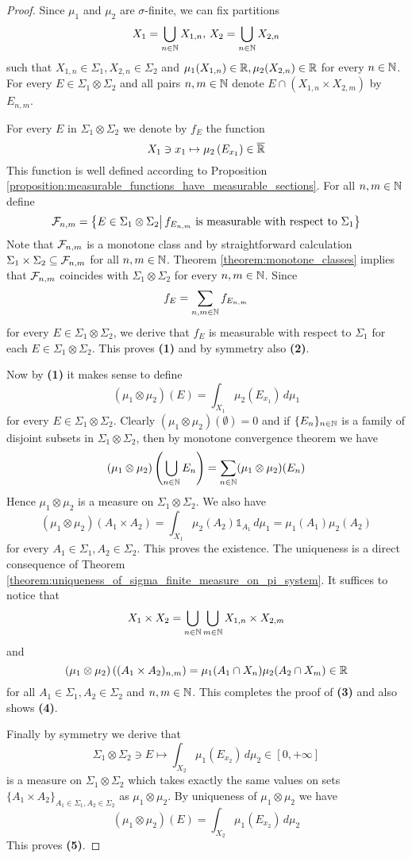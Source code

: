 \begin{proof}
    Since $\mu_1$ and $\mu_2$ are $\sigma$-finite, we can fix partitions
    $$X_1 = \bigcup_{n\in {\mathbb N}}X_{1,n},\,X_2 = \bigcup_{n\in {\mathbb N}}X_{2,n}$$
    such that $X_{1,n}\in \Sigma_1,X_{2,n}\in \Sigma_2$ and $\mu_1(X_{1,n})\in {\mathbb R},\mu_2(X_{2,n})\in {\mathbb R}$ for every $n\in {\mathbb N}$. For every $E \in \Sigma_1\otimes \Sigma_2$ and all pairs $n,m\in {\mathbb N}$ denote $E\cap (X_{1,n}\times X_{2,m})$ by $E_{n,m}$.

    For every $E$ in $\Sigma_1\otimes \Sigma_2$ we denote by $f_E$ the function
    $$X_1\ni x_1 \mapsto \mu_2\left(E_{x_1}\right)\in \overline{{\mathbb R}}$$
    This function is well defined according to Proposition \ref{proposition:measurable_functions_have_measurable_sections}. For all $n,m\in {\mathbb N}$ define 
    $${\mathcal F}_{n,m} = \big\{E \in \Sigma_1\otimes \Sigma_2 \big|\,f_{E_{n,m}}\mbox{ is measurable with respect to }\Sigma_1\big\}$$
    Note that ${\mathcal F}_{n,m}$ is a monotone class and by straightforward calculation $\Sigma_1\times \Sigma_2\subseteq {\mathcal F}_{n,m}$ for all $n,m\in {\mathbb N}$. Theorem \ref{theorem:monotone_classes} implies that ${\mathcal F}_{n,m}$ coincides with $\Sigma_1\otimes \Sigma_2$ for every $n,m \in {\mathbb N}$. Since
    $$f_{E} = \sum_{n,m\in {\mathbb N}}f_{E_{n,m}}$$
    for every $E \in \Sigma_1\otimes \Sigma_2$, we derive that $f_E$ is measurable with respect to $\Sigma_1$ for each $E \in \Sigma_1\otimes \Sigma_2$. This proves \textbf{(1)} and by symmetry also \textbf{(2)}.
    
    Now by \textbf{(1)} it makes sense to define
    $$(\mu_1\otimes \mu_2)(E) = \int_{X_1}\mu_2(E_{x_1})\,d\mu_1$$
    for every $E\in \Sigma_1\otimes \Sigma_2$. Clearly $(\mu_1\otimes \mu_2)(\emptyset) = 0$ and if $\{E_n\}_{n\in {\mathbb N}}$ is a family of disjoint subsets in $\Sigma_1\otimes \Sigma_2$, then by monotone convergence theorem we have
    $$(\mu_1\otimes \mu_2)\left(\bigcup_{n\in {\mathbb N}}E_n\right) = \sum_{n\in {\mathbb N}}(\mu_1\otimes \mu_2)(E_n)$$
    Hence $\mu_1\otimes \mu_2$ is a measure on $\Sigma_1\otimes \Sigma_2$. We also have
    $$(\mu_1\otimes \mu_2)\left(A_1\times A_2\right) = \int_{X_1}\mu_2(A_2)\mathbb{1}_{A_1}\,d\mu_1 = \mu_1(A_1)\mu_2(A_2)$$
    for every $A_1\in \Sigma_1, A_2\in \Sigma_2$. This proves the existence. The uniqueness is a direct consequence of Theorem \ref{theorem:uniqueness_of_sigma_finite_measure_on_pi_system}. It suffices to notice that
    $$X_1\times X_2 = \bigcup_{n\in {\mathbb N}}\bigcup_{m\in {\mathbb N}}X_{1,n}\times X_{2,m}$$
    and
    $$(\mu_1\otimes \mu_2)\left((A_1\times A_2)_{n,m}\right) = \mu_1(A_1\cap X_n)\mu_2(A_2\cap X_m) \in {\mathbb R}$$
    for all $A_1 \in \Sigma_1,A_2\in \Sigma_2$ and $n,m\in {\mathbb N}$. This completes the proof of \textbf{(3)} and also shows \textbf{(4)}.
    
    Finally by symmetry we derive that
    $$\Sigma_1\otimes \Sigma_2\ni E \mapsto \int_{X_2}\mu_1(E_{x_2})\,d\mu_2\in [0,+\infty]$$
    is a measure on $\Sigma_1\otimes \Sigma_2$ which takes exactly the same values on sets $\big\{A_1\times A_2\big\}_{A_1\in \Sigma_1,A_2\in \Sigma_2}$ as $\mu_1\otimes \mu_2$. By uniqueness of $\mu_1\otimes \mu_2$ we have
    $$(\mu_1\otimes \mu_2)(E) = \int_{X_2}\mu_1(E_{x_2})\,d\mu_2$$
    This proves \textbf{(5)}.
\end{proof}

